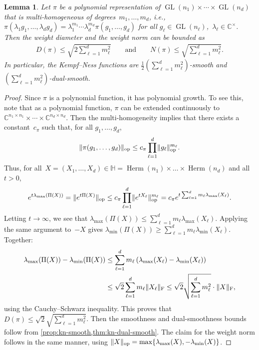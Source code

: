 \documentclass[11pt,letterpaper]{article}
\newtheorem{lemma}[theorem]{Lemma}\AddToHook{env/lemma/begin}{\crefalias{theorem}{lemma}}
\numberwithin{equation}{section}
\newcommand{\CC}{\mathbb{C}}
\newcommand{\bbH}{\mathbb{H}}
\DeclareMathOperator{\GL}{GL}
\DeclareMathOperator{\ope}{op}
\DeclareMathOperator{\Herm}{Herm}
\DeclarePairedDelimiter\norm{\lVert}{\rVert}
\begin{document}
\begin{lemma}\label{lem:multihomogeneous}
Let $\pi$ be a polynomial representation of $\GL(n_1) \times \cdots \times \GL(n_d)$ that is multi-homogeneous of degrees~$m_1,\dots,m_d$, i.e., $\pi(\lambda_1 g_1, \dots, \lambda_d g_d) = \lambda_1^{m_1} \cdots \lambda_d^{m_d} \pi(g_1,\dots,g_d)$ for all $g_\ell \in \GL(n_\ell)$,~$\lambda_\ell \in \CC^\times$.
Then the weight diameter and the weight norm can be bounded as
\begin{align*}
    D(\pi) \leq \sqrt{2 \sum_{\ell=1}^d m_\ell^2}
    \qquad\text{and}\qquad
    N(\pi) \leq \sqrt{\sum_{\ell=1}^d m_\ell^2}.
\end{align*}
In particular, the Kempf--Ness functions are $\frac12 (\sum_{\ell=1}^d m_\ell^2)$-smooth and $(\sum_{\ell=1}^d m_\ell^2)$-dual-smooth.
\end{lemma}
\begin{proof}
Since $\pi$ is a polynomial function, it has polynomial growth.
To see this, note that as a polynomial function, $\pi$ can be extended continuously to $\CC^{n_1\times n_1} \times \cdots \times \CC^{n_d\times n_d}$.
Then the multi-homogeneity implies that there exists a constant~$c_\pi$ such that, for all $g_1,\dots,g_d$,
\begin{align*}
    \norm{\pi(g_1,\dots,g_d)}_{\ope} \leq c_\pi \prod_{\ell=1}^d \norm{g_\ell}_{\ope}^{m_\ell}.
\end{align*}
Thus, for all~$X=(X_1,\dots,X_d)\in\bbH=\Herm(n_1) \times \dots \times \Herm(n_d)$ and all~$t>0$,
\begin{align*}
    e^{t\lambda_{\max}(\Pi(X))}
= \norm{e^{t \Pi(X)}}_{\ope}
\leq c_\pi \prod_{\ell=1}^d \norm{e^{tX_\ell}}_{\ope}^{m_\ell}
= c_\pi e^{t \sum_{\ell=1}^d m_\ell \lambda_{\max}(X_\ell)}.
\end{align*}
Letting $t\to\infty$, we see that $\lambda_{\max}(\Pi(X)) \leq \sum_{\ell=1}^d m_\ell \lambda_{\max}(X_\ell)$.
Applying the same argument to~$-X$ gives $\lambda_{\min}(\Pi(X)) \geq \sum_{\ell=1}^d m_\ell \lambda_{\min}(X_\ell)$.
Together:
\begin{align*}
    \lambda_{\max}(\Pi(X)) - \lambda_{\min}(\Pi(X))
&\leq \sum_{\ell=1}^d m_\ell \left( \lambda_{\max}(X_\ell) - \lambda_{\min}(X_\ell) \right) \\
&\leq \sqrt 2 \sum_{\ell=1}^d m_\ell \norm{X_\ell}_{\mathrm F}
\leq \sqrt 2 \sqrt{\sum_{\ell=1}^d m_\ell^2} \cdot \norm{X}_{\mathrm F},
\end{align*}
using the Cauchy--Schwarz inequality.
This proves that $D(\pi) \leq \sqrt 2 \sqrt{\sum_{\ell=1}^d m_\ell^2}$.
Then the smoothness and dual-smoothness bounds follow from \cref{prop:kn-smooth,thm:kn-dual-smooth}.
The claim for the weight norm follows in the same manner, using $\norm{X}_{\ope} = \max \{ \lambda_{\max}(X), -\lambda_{\min}(X) \}$.
\end{proof}
\end{document}
